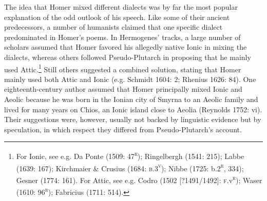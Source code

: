 \documentclass[12pt]{article}
\newenvironment{styleStandard}{\renewcommand\baselinestretch{1.25}\setlength\leftskip{0in}\setlength\rightskip{0in}\setlength\parindent{0.1972in}\setlength\parfillskip{0pt plus 1fil}\setlength\parskip{0in plus 1pt}\writerlistparindent\writerlistleftskip\leavevmode\normalfont\normalsize\writerlistlabel\ignorespaces}{\unskip\vspace{0in plus 1pt}\par}
\newcommand\writerlistleftskip{}
\newcommand\writerlistparindent{}
\newcommand\writerlistlabel{}
\begin{document}
\begin{styleStandard}
The idea that Homer mixed different dialects was by far the most popular explanation of the odd outlook of his speech. Like some of their ancient predecessors, a number of humanists claimed that one specific dialect predominated in Homer’s poems. In Hermogenes’ tracks, a large number of scholars assumed that Homer favored his allegedly native Ionic in mixing the dialects, whereas others followed Pseudo-Plutarch in proposing that he mainly used Attic.\footnote{ For Ionic, see e.g. Da Ponte (1509: 47\textsc{\textsuperscript{r}}); Ringelbergh (1541: 215); Labbe (1639: 167); Kirchmaier \& Crusius (1684: \textsc{b.3}\textsc{\textsuperscript{v}}); Nibbe (1725: b.2\textsc{\textsuperscript{r}}, 334); Gesner (1774: 161). For Attic, see e.g. Codro (1502 [?1491/1492]: \textsc{f.}v\textsc{\textsuperscript{r}}); Waser (1610: 96\textsc{\textsuperscript{r}}); Fabricius (1711: 514).} Still others suggested a combined solution, stating that Homer mainly used both Attic and Ionic (e.g. Schmidt 1604: 2; Rhenius 1626: 84). One eighteenth-century author assumed that Homer principally mixed Ionic and Aeolic because he was born in the Ionian city of Smyrna to an Aeolic family and lived for many years on Chios, an Ionic island close to Aeolia (Reynolds 1752: vi). Their suggestions were, however, usually not backed by linguistic evidence but by speculation, in which respect they differed from Pseudo-Plutarch’s account.
\end{styleStandard}
\end{document}
